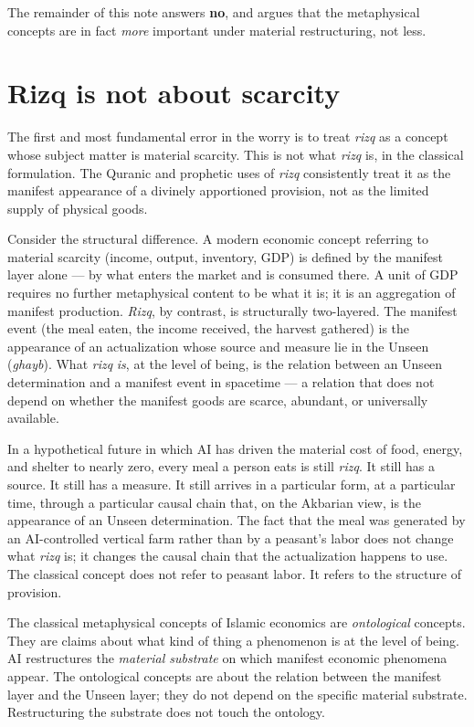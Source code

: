 \documentclass[11pt,a4paper]{article}
\newcommand{\arb}[1]{\textit{#1}}
\begin{document}
The remainder of this note answers \textbf{no}, and argues that the
metaphysical concepts are in fact \textit{more} important under
material restructuring, not less.

\section{Rizq is not about scarcity}
\label{sec:rizq-not-scarcity}

The first and most fundamental error in the worry is to treat
\arb{rizq} as a concept whose subject matter is material scarcity.
This is not what \arb{rizq} is, in the classical formulation. The
Quranic and prophetic uses of \arb{rizq} consistently treat it as
the manifest appearance of a divinely apportioned provision, not
as the limited supply of physical goods.

Consider the structural difference. A modern economic concept
referring to material scarcity (income, output, inventory, GDP) is
defined by the manifest layer alone --- by what enters the market
and is consumed there. A unit of GDP requires no further
metaphysical content to be what it is; it is an aggregation of
manifest production. \arb{Rizq}, by contrast, is structurally
two-layered. The manifest event (the meal eaten, the income
received, the harvest gathered) is the appearance of an
actualization whose source and measure lie in the Unseen
(\arb{ghayb}). What \arb{rizq} \textit{is}, at the level of being,
is the relation between an Unseen determination and a manifest
event in spacetime --- a relation that does not depend on whether
the manifest goods are scarce, abundant, or universally available.

In a hypothetical future in which AI has driven the material cost
of food, energy, and shelter to nearly zero, every meal a person
eats is still \arb{rizq}. It still has a source. It still has a
measure. It still arrives in a particular form, at a particular
time, through a particular causal chain that, on the Akbarian view,
is the appearance of an Unseen determination. The fact that the
meal was generated by an AI-controlled vertical farm rather than by
a peasant's labor does not change what \arb{rizq} is; it changes
the causal chain that the actualization happens to use. The
classical concept does not refer to peasant labor. It refers to
the structure of provision.

\begin{summarybox}
The classical metaphysical concepts of Islamic economics are
\textit{ontological} concepts. They are claims about what kind of
thing a phenomenon is at the level of being. AI restructures the
\textit{material substrate} on which manifest economic phenomena
appear. The ontological concepts are about the relation between
the manifest layer and the Unseen layer; they do not depend on the
specific material substrate. Restructuring the substrate does not
touch the ontology.
\end{summarybox}
\end{document}

